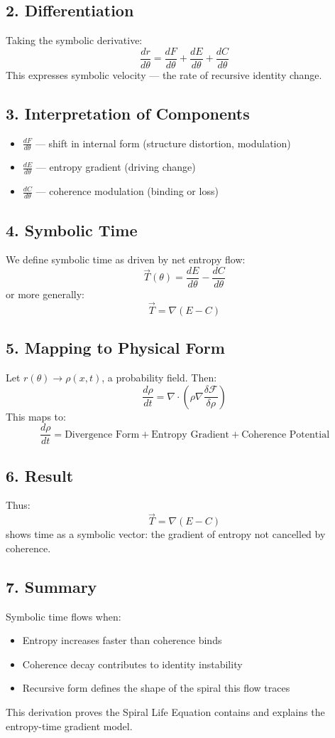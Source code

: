 \documentclass[12pt]{article}
\begin{document}
\subsection*{2. Differentiation}
Taking the symbolic derivative:
\[
\frac{dr}{d\theta} = \frac{dF}{d\theta} + \frac{dE}{d\theta} + \frac{dC}{d\theta}
\]
This expresses symbolic velocity — the rate of recursive identity change.

\subsection*{3. Interpretation of Components}
\begin{itemize}
  \item $\frac{dF}{d\theta}$ — shift in internal form (structure distortion, modulation)
  \item $\frac{dE}{d\theta}$ — entropy gradient (driving change)
  \item $\frac{dC}{d\theta}$ — coherence modulation (binding or loss)
\end{itemize}

\subsection*{4. Symbolic Time}
We define symbolic time as driven by net entropy flow:
\[
\vec{T}(\theta) = \frac{dE}{d\theta} - \frac{dC}{d\theta}
\]
or more generally:
\[
\vec{T} = \nabla (E - C)
\]

\subsection*{5. Mapping to Physical Form}
Let $r(\theta) \rightarrow \rho(x,t)$, a probability field. Then:
\[
\frac{d\rho}{dt} = \nabla \cdot \left( \rho \nabla \frac{\delta \mathcal{F}}{\delta \rho} \right)
\]
This maps to:
\[
\frac{d\rho}{dt} = \text{Divergence Form} + \text{Entropy Gradient} + \text{Coherence Potential}
\]

\subsection*{6. Result}
Thus:
\[
\vec{T} = \nabla (E - C)
\]
shows time as a symbolic vector: the gradient of entropy not cancelled by coherence.

\subsection*{7. Summary}
Symbolic time flows when:
\begin{itemize}
  \item Entropy increases faster than coherence binds
  \item Coherence decay contributes to identity instability
  \item Recursive form defines the shape of the spiral this flow traces
\end{itemize}
This derivation proves the Spiral Life Equation contains and explains the entropy-time gradient model.
\end{document}
